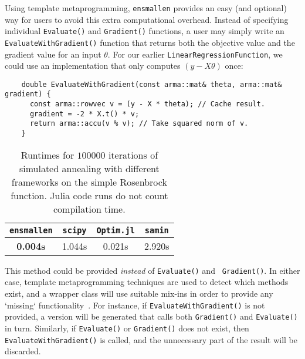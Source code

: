 \documentclass{article}
\begin{document}
Using template metaprogramming, {\tt ensmallen} provides an easy (and
optional) way for users to avoid this extra computational overhead.  Instead of
specifying individual {\tt Evaluate()} and {\tt Gradient()} functions, a user
may simply write an {\tt EvaluateWithGradient()} function that returns both the
objective value and the gradient value for an input $\theta$.  For our earlier
\texttt{LinearRegressionFunction}, we could use an implementation that only
computes $(y - X \theta)$ once:

\vspace*{-0.5em}
\begin{verbatim}
    double EvaluateWithGradient(const arma::mat& theta, arma::mat& gradient) {
      const arma::rowvec v = (y - X * theta); // Cache result.
      gradient = -2 * X.t() * v;
      return arma::accu(v % v); // Take squared norm of v.
    }
\end{verbatim}
\vspace*{-0.5em}

\begin{table}[t]
\begin{center}
\begin{tabular}{cccc}
\toprule
{\tt ensmallen} & {\tt scipy} & {\tt Optim.jl} & {\tt samin} \\
\midrule
{\bf 0.004s} & 1.044s & 0.021s & 2.920s \\
\bottomrule
\end{tabular}
\end{center}
\caption{Runtimes for $100000$ iterations of simulated annealing with different
frameworks on the simple Rosenbrock function.  Julia code runs do not count
compilation time.}
\label{tab:rosenbrock_results}
\end{table}

This method could be provided {\it instead} of {\tt Evaluate()} and {\tt
Gradient()}.  In either case, template metaprogramming techniques are used to
detect which methods exist, and a wrapper class will use suitable mix-ins in
order to provide any `missing` functionality~\cite{smaragdakis2000mixin}.  For
instance, if {\tt EvaluateWithGradient()} is not provided, a version will be
generated that calls both {\tt Gradient()} and {\tt Evaluate()} in turn.
Similarly, if {\tt Evaluate()} or {\tt Gradient()} does not exist, then {\tt
EvaluateWithGradient()} is called, and the unnecessary part of the result will
be discarded.
\end{document}
